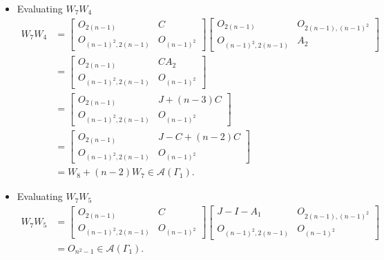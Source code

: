 \begin{itemize}
    \item Evaluating $W_7W_4$
    \begin{align*}
        W_7W_4
        &= \begin{bmatrix}
            O_{2(n-1)} & C \\
            O_{(n-1)^2, 2(n-1)} & O_{(n-1)^2}
        \end{bmatrix}\begin{bmatrix}
            O_{2(n-1)} & O_{2(n-1), (n-1)^2} \\
            O_{(n-1)^2, 2(n-1)} & A_2
        \end{bmatrix}\\
        &= \begin{bmatrix}
            O_{2(n-1)} & CA_2 \\
            O_{(n-1)^2, 2(n-1)} & O_{(n-1)^2}
        \end{bmatrix}\\
        &= \begin{bmatrix}
            O_{2(n-1)} & J + (n-3)C \\
            O_{(n-1)^2, 2(n-1)} & O_{(n-1)^2}
        \end{bmatrix}\\
        &= \begin{bmatrix}
            O_{2(n-1)} & J-C + (n-2)C \\
            O_{(n-1)^2, 2(n-1)} & O_{(n-1)^2}
        \end{bmatrix}\\
        &= W_8 + (n-2)W_7\in\mathcal{A}(\Gamma_1).
    \end{align*}
    
    \item Evaluating $W_7W_5$
    \begin{align*}
        W_7W_5
        &= \begin{bmatrix}
            O_{2(n-1)} & C \\
            O_{(n-1)^2, 2(n-1)} & O_{(n-1)^2}
        \end{bmatrix}\begin{bmatrix}
            J-I-A_1 & O_{2(n-1), (n-1)^2} \\
            O_{(n-1)^2, 2(n-1)} & O_{(n-1)^2}
        \end{bmatrix}\\
        &= O_{n^2-1}\in\mathcal{A}(\Gamma_1).
    \end{align*}
    

\end{itemize}
